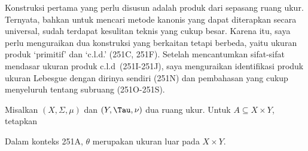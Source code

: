 
\def\chaptername{Ukuran produk}
\def\sectionname{Produk berhingga}


Konstruksi pertama yang perlu disusun adalah produk dari sepasang ruang
ukur. Ternyata, bahkan untuk mencari metode kanonis yang dapat diterapkan
secara universal, sudah terdapat kesulitan teknis yang cukup besar. Karena
itu, saya perlu menguraikan dua konstruksi yang berkaitan tetapi berbeda,
yaitu ukuran produk `primitif' dan `c.l.d.' (251C, 251F). Setelah
mencantumkan sifat-sifat mendasar ukuran produk c.l.d\ (251I-251J), saya
menguraikan identifikasi produk ukuran Lebesgue dengan dirinya sendiri
(251N) dan pembahasan yang cukup menyeluruh tentang subruang (251O-251S).

 Misalkan $(X,\Sigma,\mu)$ dan $(Y,\Tau,\nu)$
dua
ruang ukur. Untuk $A\subseteq X\times Y$, tetapkan



 Dalam konteks 251A, $\theta$ merupakan ukuran luar
pada $X\times Y$.

